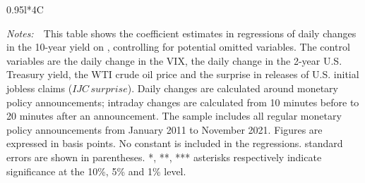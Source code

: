 \documentclass[a4paper,12pt]{article} 		%
\newcommand{\tabnote}[1]{
	\begin{tablenotes}[para,flushleft]
		\footnotesize \emph{Notes:~}~#1
	\end{tablenotes}
}
\newcommand{\textchange}[1]{\iftoggle{revised}{\textcolor{blue}{#1}}{#1}}
\providecommand{\lastobsfx}{November 2021}
\begin{document}
\begin{normalsize}
\begin{table}[tbh]
\begin{center}
\begin{threeparttable}
{\begin{tabularx}{0.95\linewidth}{l*{4}C}
					\end{tabularx}
				}
				\tabnote{This table shows the coefficient estimates in regressions of daily changes in the 10-year yield on \textchange{policy rate surprises (PRS)}, controlling for potential omitted variables. \textchange{The surprises are calculated using both intraday and daily data.} The control variables are the daily change in the VIX, the daily change in the 2-year U.S. Treasury yield, the WTI crude oil price and the surprise in releases of U.S. initial jobless claims (\(IJC \, surprise\)). Daily changes are calculated around monetary policy announcements; intraday changes are calculated from 10 minutes before to 20 minutes after an announcement. The sample includes all regular monetary policy announcements from January 2011 to \lastobsfx. Figures are expressed in basis points. No constant is included in the regressions. \textchange{Heteroskedasticity-robust} standard errors are shown in parentheses. *, **, *** asterisks respectively indicate significance at the 10\%, 5\% and 1\% level.}
			\end{threeparttable}
		\end{center}
	\end{table}
\end{normalsize}
\end{document}
